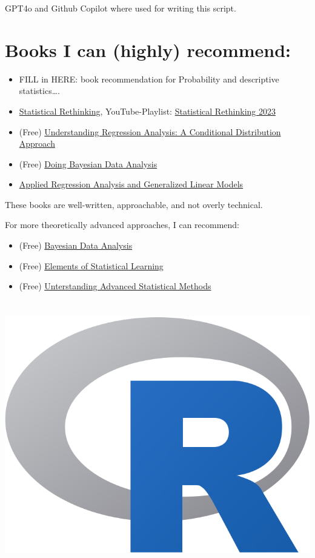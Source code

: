 \documentclass[
]{book}
\providecommand{\tightlist}{%
  \setlength{\itemsep}{0pt}\setlength{\parskip}{0pt}}
\begin{document}
GPT4o and Github Copilot where used for writing this script.

\section{Books I can (highly) recommend:}\label{books-i-can-highly-recommend}

\begin{itemize}
\tightlist
\item
  FILL in HERE: book recommendation for Probability and descriptive statistics\ldots.
\item
  \href{https://xcelab.net/rm/}{Statistical Rethinking}, YouTube-Playlist: \href{https://youtu.be/FdnMWdICdRs?si=q2py5QVY_L299hEa}{Statistical Rethinking 2023}
\item
  (Free) \href{https://vdoc.pub/documents/understanding-regression-analysis-a-conditional-distribution-approach-84oqjr8sqva0}{Understanding Regression Analysis: A Conditional Distribution Approach}
\item
  (Free) \href{https://nyu-cdsc.github.io/learningr/assets/kruschke_bayesian_in_R.pdf}{Doing Bayesian Data Analysis}
\item
  \href{https://us.sagepub.com/en-us/nam/applied-regression-analysis-and-generalized-linear-models/book237254}{Applied Regression Analysis and Generalized Linear Models}
\end{itemize}

These books are well-written, approachable, and not overly technical.

For more theoretically advanced approaches, I can recommend:

\begin{itemize}
\tightlist
\item
  (Free) \href{http://www.stat.columbia.edu/~gelman/book/}{Bayesian Data Analysis}
\item
  (Free) \href{https://web.stanford.edu/~hastie/ElemStatLearn/}{Elements of Statistical Learning}
\item
  (Free) \href{https://students.aiu.edu/submissions/profiles/resources/onlineBook/y6z7i8_t4q6Z9_advanced\%20statistics.pdf}{Unterstanding Advanced Statistical Methods}
\end{itemize}

\section{\texorpdfstring{\includegraphics[height=1.8ex]{images/Rlogo.png}}{}}\label{section}
\end{document}
